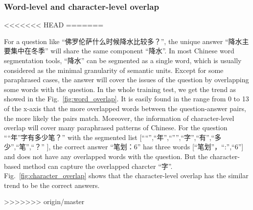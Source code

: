 \documentclass{llncs}
\begin{document}
\begin{table}[!htbp]
\begin{table}[!htbp]
\subsubsection{Word-level and character-level overlap}
<<<<<<< HEAD
=======

For a question like ``佛罗伦萨什么时候降水比较多？'', the unique answer ``降水主要集中在冬季'' will share the same component ``降水''. In most Chinese word segmentation tools, ``降水'' can be
segmented as a single word, which is usually considered as the minimal granularity of semantic units. Except for some paraphrased cases, the answer will cover the issues of the question by overlapping some words with the question. In the whole training test, we get the trend as showed in the Fig.~\ref{fig:word_overlap}. It is easily found in the range from 0 to 13 of the x-axis that the more overlapped words between the question-answer pairs, the more likely the pairs match. Moreover, the information of character-level overlap will cover many paraphrased patterns of Chinese. For the question ``“年”字有多少笔？'' with the segmented list [``“'',``年'',``”'',``字'',``有'',``多少'',``笔'',``？'' ], the correct answer ``笔划：6'' has three words [``笔划''，``:'',``6''] and does not have any overlapped words with the question. But the character-based method can capture the overlapped charcter ``字''.  
Fig.~\ref{fig:character_overlap} shows that the character-level overlap has the similar trend to be the correct answers. 

>>>>>>> origin/master


\end{table}
\end{table}
\end{document}
